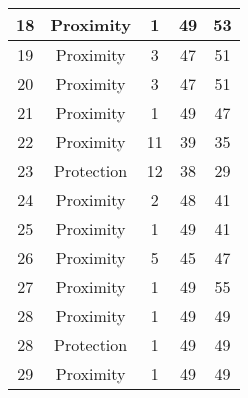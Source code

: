 \documentclass[results.tex]{subfiles}
\begin{document}
\begin{center}
\begin{tabular}{| c || c | c | c | c |}
            \hline
            18                      & Proximity                    & 1                      & 49                      & 53                   \\
            \hline
            19                      & Proximity                    & 3                      & 47                      & 51                   \\
            \hline
            20                      & Proximity                    & 3                      & 47                      & 51                   \\
            \hline
            21                      & Proximity                    & 1                      & 49                      & 47                   \\
            \hline
            22                      & Proximity                    & 11                     & 39                      & 35                   \\
            \hline
            23                      & Protection                   & 12                     & 38                      & 29                   \\
            \hline
            24                      & Proximity                    & 2                      & 48                      & 41                   \\
            \hline
            25                      & Proximity                    & 1                      & 49                      & 41                   \\
            \hline
            26                      & Proximity                    & 5                      & 45                      & 47                   \\
            \hline
            27                      & Proximity                    & 1                      & 49                      & 55                   \\
            \hline
            28                      & Proximity                    & 1                      & 49                      & 49                   \\
            \hline
            28                      & Protection                   & 1                      & 49                      & 49                   \\
            \hline
            29                      & Proximity                    & 1                      & 49                      & 49                   \\

\end{tabular}
\end{center}
\end{document}
